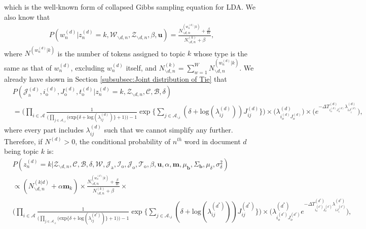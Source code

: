 \documentclass[a4paper]{article}
\begin{document}
   which is the well-known form of collapsed Gibbs sampling equation for LDA. We also know that \begin{equation}
   \begin{aligned} 
   P(w^{(d)}_n|z^{(d)}_n=k, \mathcal{W}_{\backslash d, n}, \mathcal{Z}_{\backslash d, n}, \beta, \boldsymbol{u} )=\frac{N^{(w_n^{(d)}|k)}_{\backslash d, n}+\frac{\beta}{W} }{N^{(k)}_{\backslash d, n}+\beta},
   \end{aligned}
   \end{equation}
   where $N^{(w_n^{(d)}|k)}$ is the number of tokens assigned to topic $k$ whose type is the same as that of $w_n^{(d)}$, excluding $w_n^{(d)}$ itself, and $N^{(k)}_{\backslash d, n}=\sum_{w=1}^W N_{\backslash d, n}^{(w_n^{(d)}|k)}$. We already have shown in Section \ref{subsubsec:Joint distribution of Tie} that
   \begin{equation}
   \begin{aligned}
   & P(\mathcal{J}^{(d)}_{\mbox{a}}, i^{(d)}_{\mbox{o}}, J^{(d)}_{\mbox{o}}, t^{(d)}_{\mbox{o}}| z^{(d)}_n=k, \mathcal{Z}_{\backslash d, n}, \mathcal{C}, \mathcal{B}, \delta)\\&=\Big( \prod_{i\in \mathcal{A}}\frac{1}{\Big(\prod_{j \in \mathcal{A}_{\backslash i}} \Big(\mbox{exp}\{\delta+\mbox{log}(\lambda_{ij}^{(d)})\} + 1\Big)\Big)-1}\exp\Big\{\sum_{j \in \mathcal{A}_{\backslash i}} (\delta+\mbox{log}(\lambda_{ij}^{(d)}))J_{ij}^{(d)} \Big\}\Big)\times \Big(\lambda^{(d)}_{i_o^{(d)}J_{o}^{(d)}}\Big)\times \Big(e^{-\Delta T^{(d)}_{i_o^{(d)}J_o^{(d)}}\lambda^{(d)}_{iJ^{(d)}_{i}}}\Big),
   \end{aligned}
   \end{equation}
   where every part includes $\lambda_{ij}^{(d)}$ such that we cannot simplify any further. Therefore, if $N^{(d)} > 0$, the conditional probability of $n^{th}$ word in document $d$ being topic $k$ is:
   \begin{equation}
   \begin{aligned}
   &P(z^{(d)}_n=k|\mathcal{Z}_{\backslash d, n},   \mathcal{C},   \mathcal{B}, \delta, \mathcal{W}, \mathcal{J}_{\mbox{a}}, \mathcal{I}_{\mbox{o}}, \mathcal{J}_{\mbox{o}}, \mathcal{T}_{\mbox{o}}, \beta, \boldsymbol{u}, \alpha, \boldsymbol{m},  \mu_{\boldsymbol{b}}, \Sigma_{\boldsymbol{b}}, \mu_\delta, \sigma^2_\delta)\\&\propto (N^{(k|d)}_{\backslash d, n}+\alpha \boldsymbol{m}_k)\times \frac{N^{(w_n^{(d)}|k)}_{\backslash d, n}+\frac{\beta}{W} }{N^{(k)}_{\backslash d, n}+\beta}\times \\&
   \Big(\prod_{i\in \mathcal{A}} \frac{1}{\Big(\prod_{j \in \mathcal{A}_{\backslash i}} \Big(\mbox{exp}\{\delta+\mbox{log}(\lambda_{ij}^{(d^*)})\} + 1\Big)\Big)-1}\exp\Big\{\sum_{j \in \mathcal{A}_{\backslash i}} (\delta+\mbox{log}(\lambda_{ij}^{(d^*)}))J_{ij}^{(d^*)} \Big\}\Big)\times \Big(\lambda^{(d^*)}_{i_o^{(d^*)}J_{o}^{(d^*)}}e^{-\Delta T^{(d^*)}_{i_o^{(d^*)}J_o^{(d^*)}}\lambda^{(d^*)}_{iJ^{(d^*)}_{i}}}\Big), 
   \end{aligned}
   \end{equation}
\end{document}
